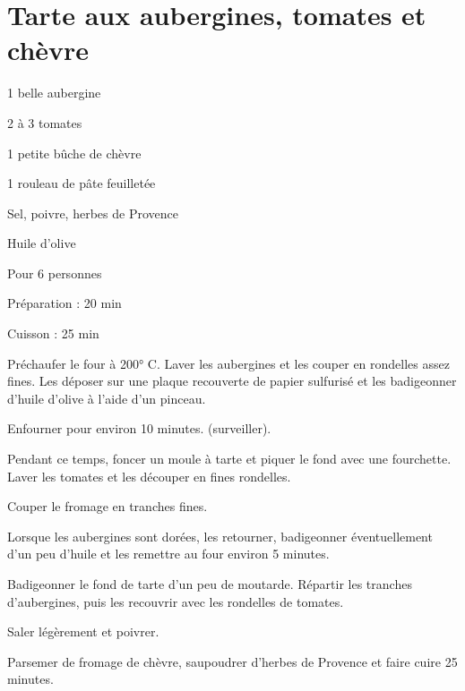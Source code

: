 \section[\normalsize{Tarte aux aubergines, tomates et ch\`evre}]{Tarte aux aubergines, tomates et ch\`evre}

\begin{ingredients}
\item 1 belle aubergine
\item 2 \`a 3 tomates
\item 1 petite bûche de ch\`evre
\item 1 rouleau de p\^ate feuillet\'ee
\item Sel, poivre, herbes de Provence
\item Huile d'olive
\end{ingredients}
\begin{infos}
\item Pour 6 personnes
\item Préparation : 20 min
\item Cuisson : 25 min
\end{infos}
\begin{etapes}
\item Pr\'echaufer le four \`a 200° C. Laver les aubergines et les couper en rondelles assez fines. Les d\'eposer sur une plaque recouverte de papier sulfuris\'e et les badigeonner d'huile d'olive \`a l'aide d'un pinceau. 
\item Enfourner pour environ 10 minutes. (surveiller).
\item Pendant ce temps, foncer un moule \`a tarte et piquer le fond avec une fourchette. Laver les tomates et les d\'ecouper en fines rondelles. 
\item Couper le fromage en tranches fines.
\item Lorsque les aubergines sont dor\'ees, les retourner, badigeonner \'eventuellement d'un peu d'huile et les remettre au four environ 5 minutes.
\item Badigeonner le fond de tarte d'un peu de moutarde. R\'epartir les tranches d'aubergines, puis les recouvrir avec les rondelles de tomates. 
\item Saler l\'eg\`erement et poivrer. 
\item Parsemer de fromage de ch\`evre, saupoudrer d'herbes de Provence et faire cuire 25 minutes.
\end{etapes}
\begin{conseils}
\end{conseils}